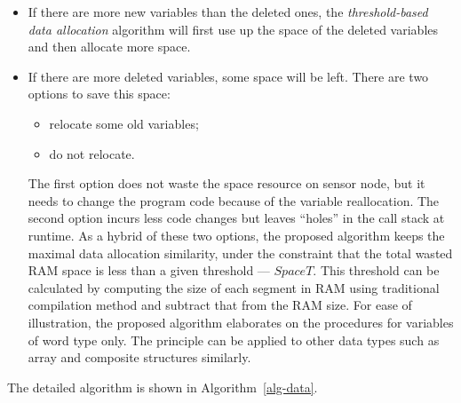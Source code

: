 \begin{itemize}
	\item If there are more
new variables than the deleted ones, the {\em
threshold-based data allocation} algorithm will first use up the space of the
deleted variables and then allocate more space. 
\item If there are more
deleted variables, some space will be left. 
There are two options to save this space: 
\begin{itemize}
\item relocate some old variables;
\item do not relocate. 
\end{itemize}
The first option
does not waste the space resource on sensor node, but it needs to
change the program code because of the 
variable reallocation. The second
option incurs less code changes but leaves ``holes'' in the call stack 
at runtime. As a hybrid of these two options, the proposed
algorithm keeps the maximal data allocation similarity, under the constraint
that the total wasted RAM space is less than a given threshold --- $SpaceT$. 
This threshold can be calculated by computing the size of each segment 
in RAM using traditional compilation method and subtract that from the RAM 
size.
For ease of illustration, the proposed algorithm
elaborates on the procedures for variables of word type only. The principle can be
applied to other data types such as array and composite structures
similarly.
\end{itemize}

The detailed algorithm is shown in Algorithm~\ref{alg-data}.

